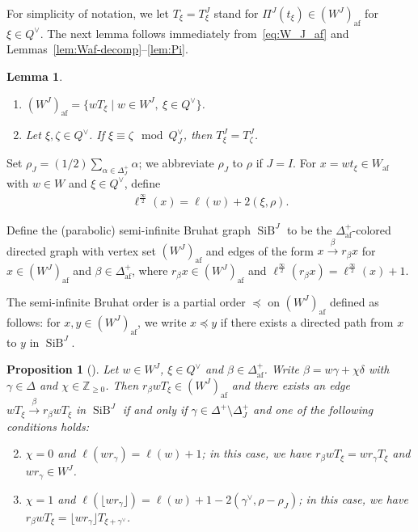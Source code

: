 \documentclass[10pt]{amsart}
\newtheorem{prop}[theo]{Proposition}
\newtheorem{lemm}[theo]{Lemma}
\theoremstyle{definition}\newtheorem{defi}[theo]{Definition}
\theoremstyle{remark}\newtheorem{rema}[theo]{Remark}
\newcommand{\BZ}{\mathbb{Z}}
\newcommand{\si}{\frac{\infty}{2}}
\DeclareMathOperator{\af}{af}
\DeclareMathOperator{\SiB}{SiB}
\begin{document}
For simplicity of notation, we let $T_{\xi} = T_{\xi}^J$ stand for 
$\Pi^J(t_{\xi}) \in (W^J)_{\af}$ for $\xi \in Q^{\vee}$. 
The next lemma follows immediately from~\eqref{eq:W_J_af} and Lemmas~\ref{lem:Waf-decomp}--\ref{lem:Pi}.

\begin{lemm} \label{lem:T_xi}\ \\[-1.2em]
\begin{enumerate}[label=(\arabic*)]
\item\label{Lemm2.4_1}
$(W^J)_{\af} = \{ wT_{\xi} \mid w \in W^J , \ \xi \in Q^{\vee} \}$.
\item\label{Lemm2.4_2}
Let 
$\xi , \zeta \in Q^{\vee}$. 
If 
$\xi \equiv \zeta \mod Q_J^{\vee}$, 
then 
$T_{\xi}^J = T_{\zeta}^J$. 
\end{enumerate}
\end{lemm}

Set $\rho_J = (1/2)\sum_{\alpha \in \Delta_J^+} \alpha$; 
we abbreviate $\rho_J$ to $\rho$ if $J = I$. 
For $x = wt_{\xi} \in W_{\af}$ with $w \in W$ and $\xi \in Q^{\vee}$, define
\begin{align}
\ell^{\si}(x) = \ell(w) + 2 ( \xi,\rho ).
\end{align}

Define the (parabolic) semi-infinite Bruhat graph $\SiB ^J$ 
to be the $\Delta_{\af}^+$-colored directed graph 
with vertex set $(W^J)_{\af}$ and edges of the form 
$x \xrightarrow{\ \beta \ } r_{\beta} x$ 
for 
$x \in (W^J)_{\af}$ and $\beta \in \Delta_{\af}^+$, 
where
$r_{\beta} x \in (W^J)_{\af}$ 
and 
$\ell^{\si}(r_{\beta}x) = \ell^{\si}(x) + 1$.

The semi-infinite Bruhat order is a partial order $\preceq$ on $(W^J)_{\af}$ 
defined as follows: 
for $x , y \in (W^J)_{\af}$, we write $x \preceq y$ 
if there exists a directed path from $x$ to $y$ in $\SiB ^J$.

\begin{prop}[{\cite[Proposition~A.1.2]{INS16}}] \label{prop:phi_J}
Let $w \in W^J$, $\xi \in Q^{\vee}$ and $\beta \in \Delta_{\af}^+$. 
Write 
$\beta = w\gamma + \chi\delta$ 
with 
$\gamma \in \Delta$ 
and 
$\chi \in \BZ_{\geq 0}$.
Then 
$r_{\beta}wT_{\xi} \in (W^J)_{\af}$
and there exists an edge 
$wT_{\xi} \xrightarrow{\ \beta \ } r_{\beta}wT_{\xi}$ in $\SiB ^J$ 
if and only if $\gamma \in \Delta^+ \setminus \Delta_J^+$ 
and one of the following conditions holds:
\begin{enumerate}[label=(\Alph*)]\setcounter{enumi}{1}
\item\label{Prop2.5_B} %
$\chi = 0$
and 
$\ell(w r_{\gamma}) = \ell(w) + 1$; 
in this case, we have 
$r_{\beta}wT_{\xi} = w r_{\gamma} T_{\xi}$ 
and 
$wr_{\gamma} \in W^J$.\setcounter{enumi}{16}
\item\label{Prop2.5_Q} %
$\chi = 1$ 
and 
$\ell(\lfloor w r_{\gamma} \rfloor) = \ell(w) + 1 - 2( \gamma^{\vee} , \rho - \rho_J )$; 
in this case, we have
$r_{\beta}wT_{\xi} = \lfloor w r_{\gamma} \rfloor T_{\xi + \gamma^{\vee}}$.
\end{enumerate}
\end{prop}
\end{document}
